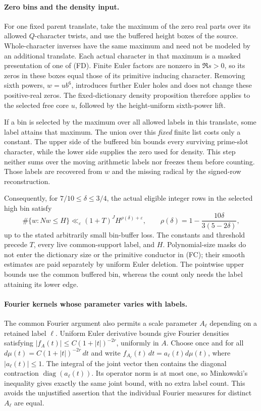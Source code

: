 \paragraph{Zero bins and the density input.}
For one fixed parent translate, take the maximum of the zero real parts
over its allowed $Q$-character twists, and use the buffered height boxes
of the source. Whole-character inverses have the same maximum and need
not be modeled by an additional translate. Each actual character in
that maximum is a masked presentation
of one of (FD). Finite Euler factors are nonzero in $\Re s>0$, so its
zeros in these boxes equal those of its primitive inducing character.
Removing sixth powers, $w=ub^6$, introduces further Euler holes and
does not change these positive-real zeros. The fixed-dictionary density
proposition therefore applies to the selected free core $u$, followed
by the height-uniform sixth-power lift.

If a bin is selected by the maximum over all allowed labels in this translate,
some label attains that maximum. The union over this \emph{fixed} finite
list costs only a constant. The upper side of the buffered bin bounds
every surviving prime-slot character, while the lower side supplies the
zero used for density. This step neither sums over the moving arithmetic
labels nor freezes them before counting. Those labels are recovered from
$w$ and the missing radical by the signed-row reconstruction.

Consequently, for $7/10\le\delta\le3/4$, the actual eligible integer rows
in the selected high bin satisfy
\[
 \#\{w:Nw\le H\}\ll_{\varepsilon}
       (1+T)^J H^{\rho(\delta)+\varepsilon},\qquad
 \rho(\delta)=1-\frac{10\delta}{3(5-2\delta)},
\]
up to the stated arbitrarily small bin-buffer loss. The constants and
threshold precede $T$, every live common-support label, and $H$.
Polynomial-size masks do not enter the dictionary size or the primitive
conductor in (FC); their smooth estimates are paid separately by uniform
Euler deletion. The pointwise upper bounds use the common buffered bin,
whereas the count only needs the label attaining its lower edge.

\paragraph{Fourier kernels whose parameter varies with labels.}
The common Fourier argument also permits a scale parameter $A_\ell$
depending on a retained label $\ell$. Uniform Euler derivative bounds
give Fourier densities satisfying
$|f_A(t)|\le C(1+|t|)^{-2r}$, uniformly in $A$. Choose once and for all
$d\mu(t)=C(1+|t|)^{-2r}\,dt$ and write
$f_{A_\ell}(t)\,dt=a_\ell(t)d\mu(t)$, where $|a_\ell(t)|\le1$.
The integral of the joint vector then contains the diagonal contraction
$\operatorname{diag}(a_\ell(t))$. Its operator norm is at most one,
so Minkowski's inequality gives exactly the same joint bound, with no
extra label count. This avoids the unjustified assertion that the
individual Fourier measures for distinct $A_\ell$ are equal.

